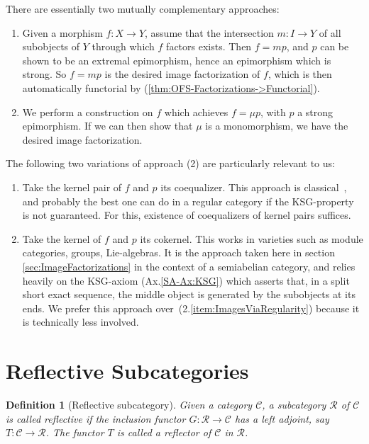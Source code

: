 \documentclass [12pt,oneside]{book}%
\theoremstyle{captionstyle}  %
\newtheorem{definition}[theorem]{Definition}
\newcommand{\Defn}[1]{\emph{#1}}
\newcommand{\from}{\colon}				%
\begin{document}
There are essentially two mutually complementary approaches:
\begin{enumerate}[(1)]
    \item Given a morphism $f\from X\to Y$, assume that the intersection $m\from I\to Y$ of all subobjects of $Y$ through which $f$ factors exists. Then $f=mp$, and $p$ can be shown to be an extremal epimorphism, hence an epimorphism which is strong. So $f=mp$ is the desired image factorization of $f$, which is then automatically functorial by (\ref{thm:OFS-Factorizations->Functorial}).
    \item We perform a construction on $f$ which achieves $f=\mu p$, with $p$ a strong epimorphism. If we can then show that $\mu$ is a monomorphism, we have the desired image factorization.
\end{enumerate}
The following two variations of approach (2) are particularly relevant to us:
\begin{enumerate}[({2}.a)]
    \item\label{item:ImagesViaRegularity} Take the kernel pair of $f$ and $p$ its coequalizer. This approach is classical~\cite{Barr-Grillet-vanOsdol}, and probably the best one can do in a regular category if the KSG-property is not guaranteed. For this, existence of coequalizers of kernel pairs suffices. %
    \item Take the kernel of $f$ and $p$ its cokernel. This works in varieties such as module categories, groups, Lie-algebras. It is the approach taken here in section \ref{sec:ImageFactorizations} in the context of a semiabelian category, and relies heavily on the KSG-axiom (Ax.\ref{SA-Ax:KSG}) which asserts that, in a split short exact sequence, the middle object is generated by the subobjects at its ends. We prefer this approach over~(2.\ref{item:ImagesViaRegularity}) because it is technically less involved.
\end{enumerate}
\section[Reflective Subcategories]{Reflective Subcategories}
\label{sec:ReflectiveSubCats}

\begin{definition}[Reflective subcategory]
    \label{def:ReflectiveSubCat}%
    Given a category $\mathcal{C}$, a subcategory $\mathcal{R}$ of $\mathcal{C}$ is called \Defn{reflective} if the inclusion functor $G\from \mathcal{R}\to \mathcal{C}$ has a left adjoint, say $T\from \mathcal{C}\to \mathcal{R}$.  The functor $T$ is called a \Defn{reflector} of $\mathcal{C}$ in $\mathcal{R}$. %
\end{definition}
\end{document}
